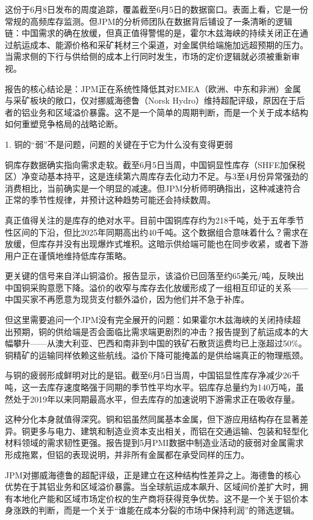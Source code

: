 \documentclass[11pt]{ctexart}
\begin{document}
这份于6月8日发布的周度追踪，覆盖截至6月5日的数据窗口。表面上看，它是一份常规的高频库存监测。但JPM的分析师团队在数据背后铺设了一条清晰的逻辑链：中国需求的确在放缓，但真正值得警惕的是，霍尔木兹海峡的持续关闭正在通过航运成本、能源价格和采矿耗材三个渠道，对金属供给端施加远超预期的压力。当需求侧的下行与供给侧的成本上行同时发生，市场的定价逻辑就必须被重新审视。

报告的核心结论是：JPM正在系统性降低其对EMEA（欧洲、中东和非洲）金属与采矿板块的敞口，仅对挪威海德鲁（Norsk Hydro）维持超配评级，原因在于后者的铝业务和区域溢价暴露。这不是一个简单的周期判断，而是一个关于成本结构如何重塑竞争格局的战略论断。

1. 铜的“弱”不是问题，问题的关键在于它为什么没有变得更弱

铜库存数据确实指向需求走软。截至6月5日当周，中国铜显性库存（SHFE加保税区）净变动基本持平，这是连续第六周库存去化动力不足。与3至4月份异常强劲的消费相比，当前确实是一个明显的减速。但JPM分析师明确指出，这种减速符合正常的季节性规律，并预计这种趋势可能还会持续数周。

真正值得关注的是库存的绝对水平。目前中国铜库存约为218千吨，处于五年季节性区间的下沿，但比2025年同期高出约40千吨。这个数据组合意味着什么？需求在放缓，但库存并没有出现爆炸式堆积。这暗示供给端可能也在同步收紧，或者下游用户正在谨慎地维持低库存策略。

更关键的信号来自洋山铜溢价。报告显示，该溢价已回落至约65美元/吨，反映出中国铜采购意愿下降。溢价的收窄与库存去化放缓形成了一组相互印证的关系——中国买家不再愿意为现货支付额外溢价，因为他们并不急于补库。

但这里需要追问一个JPM没有完全展开的问题：如果霍尔木兹海峡的关闭持续超出预期，铜的供给端是否会面临比需求端更剧烈的冲击？报告提到了航运成本的大幅攀升——从澳大利亚、巴西和南非到中国的铁矿石散货运费均已上涨超过50\%。铜精矿的运输同样依赖这些航线。溢价下降可能掩盖的是供给端真正的物理瓶颈。

与铜的疲弱形成鲜明对比的是铝。截至6月5日当周，中国铝显性库存净减少26千吨，这一去库存速度略强于同期的季节性平均水平。铝库存总量约为140万吨，虽然处于2019年以来同期最高水平，但去库存的加速说明下游需求正在吸收存量。

这种分化本身就值得深究。铜和铝虽然同属基本金属，但下游应用结构存在显著差异。铜更多与电力、建筑和制造业资本支出相关，而铝在交通运输、包装和轻型化材料领域的需求韧性更强。报告提到5月PMI数据中制造业活动的疲弱对金属需求形成拖累，但铝的表现说明，并非所有金属都在承受同样的压力。

JPM对挪威海德鲁的超配评级，正是建立在这种结构性差异之上。海德鲁的核心优势在于其铝业务和区域溢价暴露。当全球航运成本飙升、区域间价差扩大时，拥有本地化产能和区域市场定价权的生产商将获得竞争优势。这不是一个关于铝价本身涨跌的判断，而是一个关于“谁能在成本分裂的市场中保持利润”的筛选逻辑。
\end{document}
